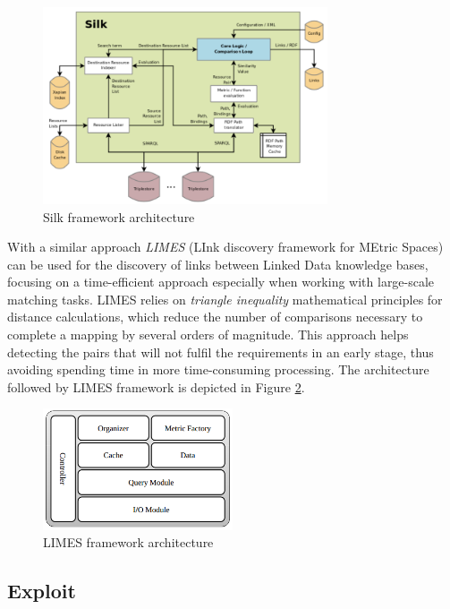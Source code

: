 \begin{figure}
    \center
    \includegraphics[width=0.75\textwidth]{img/ld_approach/silk.png}
    \caption{Silk framework architecture}
    \label{fig:silk}
\end{figure}

With a similar approach \textit{LIMES} (LInk discovery framework for MEtric Spaces) \cite{ngomo2011limes} can be used for the discovery of links between Linked Data knowledge bases, focusing on a time-efficient approach especially when working with large-scale matching tasks. LIMES relies on \textit{triangle inequality} mathematical principles for distance calculations, which reduce the number of comparisons necessary to complete a mapping by several orders of magnitude. This approach helps detecting the pairs that will not fulfil the requirements in an early stage, thus avoiding spending time in more time-consuming processing. The architecture followed by LIMES framework is depicted in Figure \ref{fig:limes}.

\begin{figure}
    \center
    \includegraphics[width=0.5\textwidth]{img/ld_approach/limes.png}
    \caption{LIMES framework architecture}
    \label{fig:limes}
\end{figure}

\subsection{Exploit}
\label{subsec:exploit}

